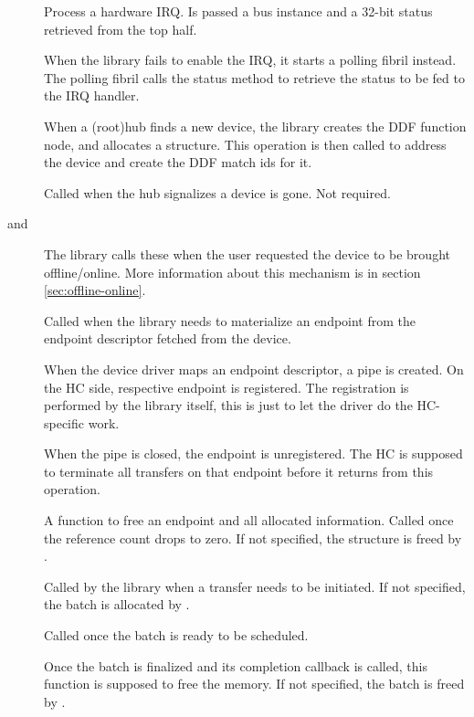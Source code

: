 \begin{description}
	\item[]
		Process a hardware IRQ. Is passed a bus instance and a 32-bit status
		retrieved from the top half.
	\item[]
		When the library fails to enable the IRQ, it starts a polling fibril
		instead. The polling fibril calls the status method to retrieve the
		status to be fed to the IRQ handler.

	\item[]
		When a (root)hub finds a new device, the library creates the DDF
		function node, and allocates a  structure. This
		operation is then called to address the device and create the DDF match
		ids for it.
	\item[]
		Called when the hub signalizes a device is gone. Not required.
	\item[ and ]
		The library calls these when the user requested the device to be brought
		offline/online. More information about this mechanism is in section
		\ref{sec:offline-online}.

	\item[]
		Called when the library needs to materialize an endpoint from the
		endpoint descriptor fetched from the device.
	\item[]
		When the device driver maps an endpoint descriptor, a pipe is created.
		On the HC side, respective endpoint is registered. The registration
		is performed by the library itself, this is just to let the driver do
		the HC-specific work.
	\item[]
		When the pipe is closed, the endpoint is unregistered. The HC is
		supposed to terminate all transfers on that endpoint before it returns
		from this operation.
	\item[]
		A function to free an endpoint and all allocated information. Called
		once the reference count drops to zero. If not specified, the structure
		is freed by .

	\item[]
		Called by the library when a transfer needs to be initiated. If not
		specified, the batch is allocated by .
	\item[]
		Called once the batch is ready to be scheduled.
	\item[]
		Once the batch is finalized and its completion callback is called, this
		function is supposed to free the memory. If not specified, the batch is freed by .
\end{description}

